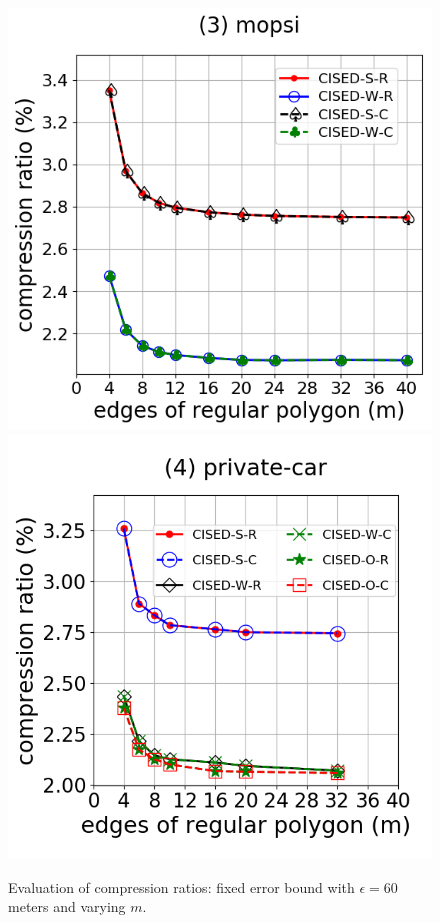 \begin{figure}[tb!]
\includegraphics[scale = 0.28]{Figures/Exp-M-e-60-CR-mopsi.png}
\includegraphics[scale = 0.28]{Figures/Exp-M-e-60-CR-private.png}
\vspace{-1ex}
\caption{\small Evaluation of compression ratios: fixed error bound with $\epsilon=60$ meters and varying $m$.}
\label{fig:m-cr-e60}
\vspace{-1ex}
\end{figure}


